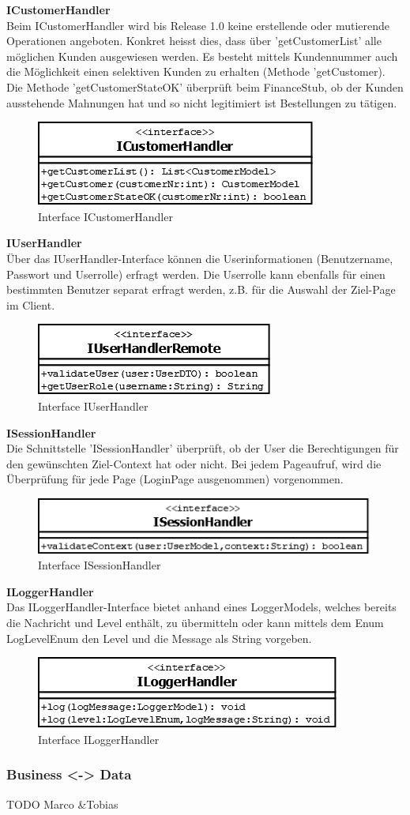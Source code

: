 \textbf{ICustomerHandler}\\
Beim ICustomerHandler wird bis Release 1.0 keine erstellende oder mutierende Operationen angeboten. Konkret heisst dies, dass über 'getCustomerList' alle möglichen Kunden ausgewiesen werden. Es besteht mittels Kundennummer auch die Möglichkeit einen selektiven Kunden zu erhalten (Methode 'getCustomer).\\
Die Methode 'getCustomerStateOK' überprüft beim FinanceStub, ob der Kunden ausstehende Mahnungen hat und so nicht legitimiert ist Bestellungen zu tätigen.
\begin{figure}[H]
	\includegraphics[width=0.4\linewidth]{Images/ICustomerHandler}
	\caption{Interface ICustomerHandler}
	\label{fig:if-ICustomerHandler}
\end{figure}
\textbf{IUserHandler}\\
Über das IUserHandler-Interface können die Userinformationen (Benutzername, Passwort und Userrolle) erfragt werden. Die Userrolle kann ebenfalls für einen bestimmten Benutzer separat erfragt werden, z.B. für die Auswahl der Ziel-Page im Client.
\begin{figure}[H]
	\includegraphics[width=0.4\linewidth]{Images/IUserHandler}
	\caption{Interface IUserHandler}
	\label{fig:if-IUserHandler}
\end{figure}
\clearpage
\textbf{ISessionHandler}\\
Die Schnittstelle 'ISessionHandler' überprüft, ob der User die Berechtigungen für den gewünschten Ziel-Context hat oder nicht. Bei jedem Pageaufruf, wird die Überprüfung für jede Page (LoginPage ausgenommen) vorgenommen.
\begin{figure}[H]
	\includegraphics[width=0.5\linewidth]{Images/ISessionHandler}
	\caption{Interface ISessionHandler}
	\label{fig:if-ISessionHandler}
\end{figure}
\textbf{ILoggerHandler}\\
Das ILoggerHandler-Interface bietet anhand eines LoggerModels, welches bereits die Nachricht und Level enthält, zu übermitteln oder kann mittels dem Enum LogLevelEnum den Level und die Message als String vorgeben.
\begin{figure}[H]
	\includegraphics[width=0.5\linewidth]{Images/ILoggerHandler}
	\caption{Interface ILoggerHandler}
	\label{fig:if-ILoggerHandler}
\end{figure}



\subsubsection{Business <-> Data}
TODO Marco \&Tobias
